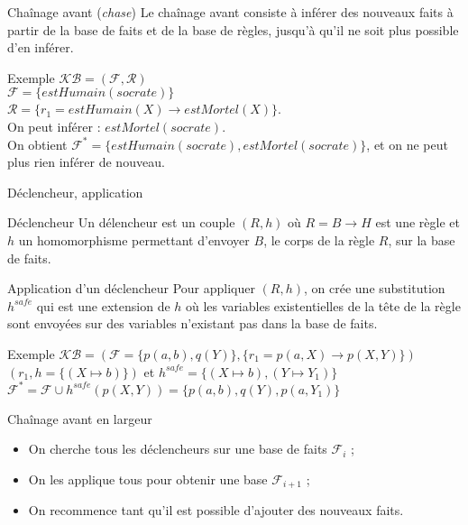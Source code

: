 

\begin{frame}{Chaînage avant (\textit{chase})}
    Le chaînage avant consiste à inférer des nouveaux faits à partir de la base de faits et de la base de règles, jusqu'à qu'il ne soit plus possible d'en inférer.
    \begin{block}{Exemple}
        $\mathcal{KB} = (\mathcal{F}, \mathcal{R})$
        \\ $\mathcal{F} = \{estHumain(socrate)\}$
        \\ $\mathcal{R} = \{r_1 = estHumain(X) \rightarrow estMortel(X)\}$.
        \\ On peut inférer : $estMortel(socrate)$.
        \\ On obtient $\mathcal{F}^* = \{estHumain(socrate), estMortel(socrate)\}$, et on ne peut plus rien inférer de nouveau.
    \end{block}
\end{frame}

\begin{frame}{Déclencheur, application}
    \begin{block}{Déclencheur}
        Un délencheur est un couple $(R,h)$ où $R = B \rightarrow H$ est une règle et $h$ un homomorphisme permettant d'envoyer $B$, le corps de la règle $R$, sur la base de faits.
    \end{block}
    \begin{block}{Application d'un déclencheur}
        Pour appliquer $(R,h)$, on crée une substitution $h^{safe}$ qui est une extension de $h$ où les variables existentielles de la tête de la règle sont envoyées sur des variables n'existant pas dans la base de faits.
    \end{block}
    \begin{block}{Exemple}
        $\mathcal{KB} = (\mathcal{F} = \{p(a,b),q(Y)\}, \{r_1 = p(a,X) \rightarrow p(X,Y)\})$ \\
        $(r_1,h = \{(X \mapsto b)\})$ et
        $h^{safe} = \{(X \mapsto b), (Y \mapsto Y_1)\}$ \\
        $\mathcal{F}^* = \mathcal{F} \cup h^{safe}(p(X,Y)) = \{p(a,b),q(Y),p(a,Y_1)\}$
    \end{block}
\end{frame}

\begin{frame}{Chaînage avant en largeur}
    \begin{itemize}
        \item On cherche tous les déclencheurs sur une base de faits $\mathcal{F}_i$ ;
        \item On les applique tous pour obtenir une base $\mathcal{F}_{i+1}$ ;
        \item On recommence tant qu'il est possible d'ajouter des nouveaux faits.
    \end{itemize}
\end{frame}